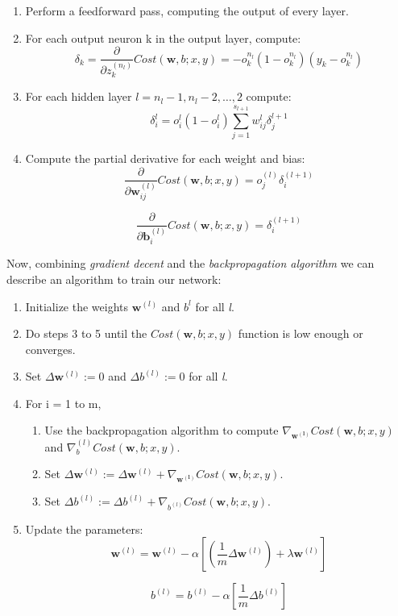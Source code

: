 \begin{enumerate}
	\item Perform a feedforward pass, computing the output of every layer.
	\item For each output neuron k in the output layer, compute: 
	\begin{equation*}
		\delta_k = \frac{\partial}{\partial z_{k}^{(n_l)} }Cost(\mathbf{w},b; x, y) = -o_k^{n_l}(1-o_k^{n_l})(y_k-o_k^{n_l})
	\end{equation*} 
	\item For each hidden layer $ l = n_l - 1, n_l - 2,\dots, 2 $ compute: 
	\begin{equation*}
		\delta_i^{l} = o_i^l(1-o_i^l)\sum_{j=1}^{s_{l+1}} w_{ij}^l \delta_j^{l+1} 
	\end{equation*}
	\item Compute the partial derivative for each weight and bias:
	\begin{equation*}
		\frac{\partial}{\partial\mathbf{w}_{ij}^{(l)} }Cost(\mathbf{w},b; x, y) = o_j^{(l)}\delta_i^{(l+1)}
	\end{equation*}
	
	\begin{equation*}
		\frac{\partial}{\partial\mathbf{b}_{i}^{(l)} }Cost(\mathbf{w},b; x, y) = \delta_i^{(l+1)}
	\end{equation*}
\end{enumerate}
	
Now, combining \textit{gradient decent} and the \textit{backpropagation algorithm} we can describe an algorithm to train our network: 

\begin{enumerate}
	\item Initialize the weights $ \mathbf{w}^{(l)} $ and $ b^{l} $ for all \textit{l}.
	\item Do steps 3 to 5 until the $ Cost(\mathbf{w}, b; x, y) $ function is low enough or converges.
	\item Set $ \Delta\mathbf{w}^{(l)} := 0 $ and $ \Delta b^{(l)} := 0 $ for all \textit{l}.
	\item For i = 1 to m,
		\begin{enumerate}
			\item Use the backpropagation algorithm to compute $ \nabla_\mathbf{w^{(l)}}Cost(\mathbf{w}, b;x,y) $ and $ \nabla_b^{(l)}Cost(\mathbf{w}, b;x,y) $.
			\item  Set $ \Delta\mathbf{w}^{(l)} := \Delta\mathbf{w}^{(l)} + \nabla_\mathbf{w^{(l)}}Cost(\mathbf{w}, b;x,y) $. 
			\item  Set $ \Delta b^{(l)} := \Delta b^{(l)} + \nabla_{b^{(l)}}Cost(\mathbf{w}, b;x,y) $. 
		\end{enumerate}
	\item Update the parameters:
		\begin{equation*}
			\mathbf{w}^{(l)} = \mathbf{w}^{(l)} - \alpha[(\frac{1}{m}\Delta\mathbf{w}^{(l)}) + \lambda\mathbf{w}^{(l)}]
		\end{equation*}
		
		\begin{equation*}
			b^{(l)} = b^{(l)} - \alpha[\frac{1}{m}\Delta b^{(l)}]
		\end{equation*}
\end{enumerate}

